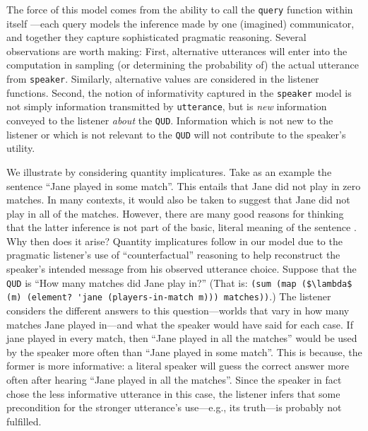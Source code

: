 \documentclass[pdfextras]{handbook}
\begin{document}
The force of this model comes from the ability to call the \lstinline{query} function within itself \citep{Stuhlmueller2013}---each query models the inference made by one (imagined) communicator, and together they capture sophisticated pragmatic reasoning. 
Several observations are worth making: First, alternative utterances will enter into the computation in sampling (or determining the probability of) the actual utterance from \lstinline{speaker}. 
Similarly, alternative values are considered in the listener functions.
Second, the notion of informativity captured in the \lstinline{speaker} model is not simply information transmitted by \lstinline{utterance}, but is \emph{new} information conveyed to the listener \emph{about} the \lstinline{QUD}. 
Information which is not new to the listener or which is not relevant to the \lstinline{QUD} will not contribute to the speaker's utility.

We illustrate by considering quantity implicatures. 
Take as an example the sentence ``Jane played in some match''. 
This entails that Jane did not play in zero matches. 
In many contexts, it would also be taken to suggest that Jane did not play in all of the matches. 
However, there are many good reasons for thinking that the latter inference is not part of the basic, literal meaning of the sentence \citep{grice89,geurts2010quantity}. 
Why then does it arise?
%
Quantity implicatures follow in our model due to the pragmatic listener's use of ``counterfactual'' reasoning to help reconstruct the speaker's intended message from his observed utterance choice.
Suppose that the \lstinline{QUD} is ``How many matches did Jane play in?'' (That is: 
\lstinline[mathescape]{(sum (map ($\lambda$ (m) (element? 'jane (players-in-match m))) matches))}.)
The listener considers the different answers to this question---worlds that vary in how many matches Jane played in---and what the speaker would have said for each case. 
If jane played in every match, then ``Jane played in all the matches'' would be used by the speaker more often than ``Jane played in some match''.
This is because, the former is more informative: a literal speaker will guess the correct answer more often after hearing ``Jane played in all the matches''.
Since the speaker in fact chose the less informative utterance in this case, the listener infers that some precondition for the stronger utterance's use---e.g., its truth---is probably not fulfilled. 
\end{document}
